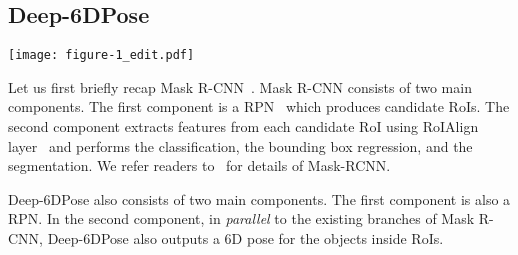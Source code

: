 \documentclass[conference]{IEEEtran}
\newcommand{\method}[1]{Deep-6DPose}
\begin{document}
\subsection{\method{}}\begin{figure*}[!t] 
\centering   				
\texttt{[image: figure-1\_edit.pdf]}    
    \caption{An overview of \method{} framework. {From left to right:} The input to \method{} is a RGB image. A deep CNN backbone (i.e., VGG) is used to extract features over the whole image. The RPN is attached on the last convolutional layer of VGG (i.e., $conv5\_3$) and outputs RoIs. For each RoI, the corresponding features from the feature map $conv5\_3$ are extracted and pooled into a fixed size $7\times 7$. The pooled features are used as inputs for $4$ head branches. For the box regression and classification heads, we follow Mask-RCNN~\cite{Mask-RCNN}. The segmentation head is \textit{adapted} from~\cite{Mask-RCNN}, i.e., four $3\times3$ consecutive convolutional layers (denoted as `$\times4$') are used. The ReLu is used after each convolutional layer. A deconvolutional layer is used to upsample the feature map to $28\times28$ which is the segmentation mask. The proposed pose head consists of four fully connected layers. The ReLu is used after each of the first three fully connected layers. The last fully connected layer outputs four numbers which represent for the pose. As shown on the right image, the network outputs the detected instances (with classes, i.e., Shampoo), the predicted segmentation masks (different object instances are shown with different colors) and the predicted 6D poses for detected instances (shown with 3D boxes). %
}
    \label{fig:overview} 
\end{figure*}

Let us first briefly recap Mask R-CNN~\cite{Mask-RCNN}. Mask R-CNN consists of two main components. The first component is a RPN~\cite{Faster-RCNN} which produces candidate RoIs. The second component extracts features from each candidate RoI using RoIAlign layer~\cite{Mask-RCNN} and performs the classification, the bounding box regression, and the segmentation. We refer readers to~\cite{Mask-RCNN} for details of Mask-RCNN. 

\method{} also consists of two main components. The first component is also a RPN. In the second component, in \textit{parallel} to the existing branches of Mask R-CNN, \method{} also outputs a 6D pose for the objects inside RoIs. 
\end{document}
